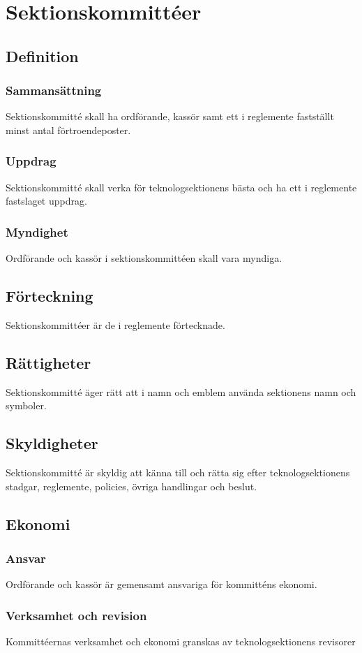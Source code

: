 \section{Sektionskommittéer}

\subsection{Definition}

\subsubsection{Sammansättning}
Sektionskommitté skall ha ordförande, kassör samt ett i reglemente fastställt minst antal förtroendeposter.

\subsubsection{Uppdrag}
Sektionskommitté skall verka för teknologsektionens bästa och ha ett i reglemente fastslaget uppdrag.

\subsubsection{Myndighet}
Ordförande och kassör i sektionskommittéen skall vara myndiga.

\subsection{Förteckning}

Sektionskommittéer är de i reglemente förtecknade.

\subsection{Rättigheter}

Sektionskommitté äger rätt att i namn och emblem använda sektionens namn och symboler.

\subsection{Skyldigheter}

Sektionskommitté är skyldig att känna till och rätta sig efter teknologsektionens stadgar, reglemente, policies, övriga handlingar och beslut.

\subsection{Ekonomi}
\subsubsection{Ansvar}
Ordförande och kassör är gemensamt ansvariga för kommitténs ekonomi.

\subsubsection{Verksamhet och revision}
Kommittéernas verksamhet och ekonomi granskas av teknologsektionens revisorer
